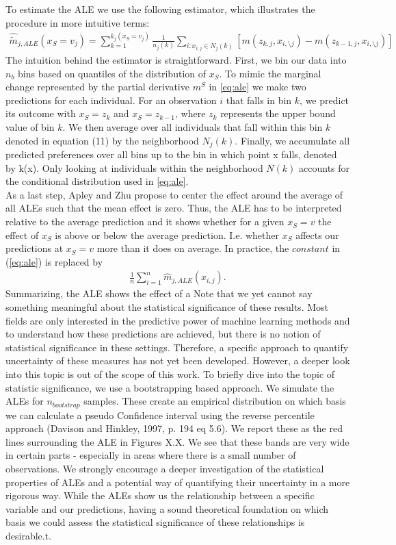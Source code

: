 To estimate the ALE we use the following estimator, which illustrates the procedure in more intuitive terms: 
\begin{align}
\hat{\tilde{m}}_{j, ALE}(x_S=v_j)=\sum_{k=1}^{k_j(x_S=v_j)} \frac{1}{n_j(k)}\sum_{i:x_{i,j}\in N_j(k)}[m(z_{k,j}, x_{i,\setminus j})-m(z_{k-1,j}, x_{i,\setminus j})] \label{eq:ale_estim}
\end{align}
The intuition behind the estimator is straightforward. First, we bin our data into $n_b$ bins based on quantiles of the distribution of $x_S$. To mimic the marginal change represented by the partial derivative $m^S$ in \ref{eq:ale} we make two predictions for each individual. For an observation $i$ that falls in bin $k$, we predict its outcome with $x_S=z_k$ and $x_S=z_{k-1}$, where $z_k$ represents the upper bound value of bin $k$. We then average over all individuals that fall within this bin $k$ denoted in equation (11) by the neighborhood $N_j(k)$. Finally, we accumulate all predicted preferences over all bins up to the bin in which point x falls, denoted by k(x). Only looking at individuals within the neighborhood $N(k)$ accounts for the conditional distribution used in \ref{eq:ale}. \\
As a last step, Apley and Zhu propose to center the effect around the average of all ALEs such that the mean effect is zero. Thus, the ALE has to be interpreted relative to the average prediction and it shows whether for a given $x_S=v$ the effect of $x_S$ is above or below the average prediction. I.e. whether $x_S$ affects our predictions at $x_S=v$ more than it does on average. In practice, the $constant$ in (\ref{eq:ale}) is replaced by 
\begin{align*}
    \frac{1}{n}\sum_{i=1}^n \hat{m}_{j, ALE}(x_{i, j}).
\end{align*}
Summarizing, the ALE shows the effect of a 
Note that we yet cannot say something meaningful about the statistical significance of these results. Most fields are only interested in the predictive power of machine learning methods and to understand how these predictions are achieved, but there is no notion of statistical significance in these settings. Therefore, a specific approach to quantify uncertainty of these measures has not yet been developed. However, a deeper look into this topic is out of the scope of this work. To briefly dive into the topic of statistic significance, we use a bootstrapping based approach. We simulate the ALEs for $n_{bootstrap}$ samples. These create an empirical distribution on which basis we can calculate a pseudo Confidence interval using the reverse percentile approach (Davison and Hinkley, 1997, p. 194 eq 5.6). We report these as the red lines surrounding the ALE in Figures X.X. We see that these bands are very wide in certain parts - especially in areas where there is a small number of observations. We strongly encourage a deeper investigation of the statistical properties of ALEs and a potential way of quantifying their uncertainty in a more rigorous way. While the ALEs show us the relationship between a specific variable and our predictions, having a sound theoretical foundation on which basis we could assess the statistical significance of these relationships is desirable.t. 

